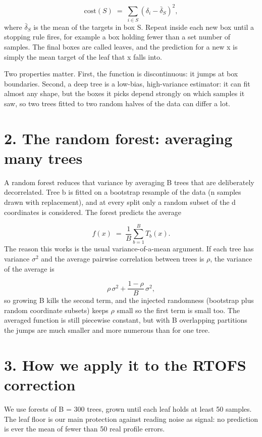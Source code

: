 \documentclass[11pt]{article}
\begin{document}
\[ \mathrm{cost}(S) \;=\; \sum_{i \in S} (\delta_i - \bar{\delta}_S)^2, \]
where $\bar{\delta}_S$ is the mean of the targets in box S. Repeat inside each new box until a stopping rule fires, for example a box holding fewer than a set number of samples. The final boxes are called leaves, and the prediction for a new x is simply the mean target of the leaf that x falls into.

Two properties matter. First, the function is discontinuous: it jumps at box boundaries. Second, a deep tree is a low-bias, high-variance estimator: it can fit almost any shape, but the boxes it picks depend strongly on which samples it saw, so two trees fitted to two random halves of the data can differ a lot.

\section*{2. The random forest: averaging many trees}
A random forest reduces that variance by averaging B trees that are deliberately decorrelated. Tree b is fitted on a bootstrap resample of the data (n samples drawn with replacement), and at every split only a random subset of the d coordinates is considered. The forest predicts the average

\[ f(x) \;=\; \frac{1}{B}\sum_{b=1}^{B} T_b(x). \]
The reason this works is the usual variance-of-a-mean argument. If each tree has variance $\sigma^2$ and the average pairwise correlation between trees is $\rho$, the variance of the average is

\[ \rho\,\sigma^2 + \frac{1-\rho}{B}\,\sigma^2, \]
so growing B kills the second term, and the injected randomness (bootstrap plus random coordinate subsets) keeps $\rho$ small so the first term is small too. The averaged function is still piecewise constant, but with B overlapping partitions the jumps are much smaller and more numerous than for one tree.

\section*{3. How we apply it to the RTOFS correction}
We use forests of B = 300 trees, grown until each leaf holds at least 50 samples. The leaf floor is our main protection against reading noise as signal: no prediction is ever the mean of fewer than 50 real profile errors.
\end{document}
